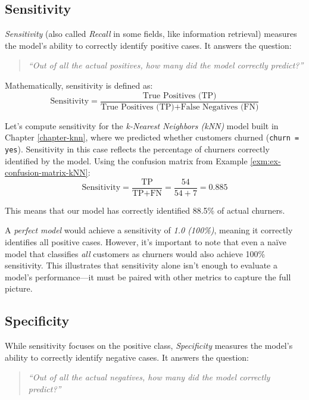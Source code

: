 \documentclass[
  11pt,
]{book}
\newcommand{\passthrough}[1]{#1}
\theoremstyle{definition}
\theoremstyle{definition}
\theoremstyle{definition}
\theoremstyle{definition}
\theoremstyle{remark}
\begin{document}
\subsection*{Sensitivity}\label{sensitivity}


\emph{Sensitivity} (also called \emph{Recall} in some fields, like information retrieval) measures the model's ability to correctly identify positive cases. It answers the question:

\begin{quote}
\emph{``Out of all the actual positives, how many did the model correctly predict?''}
\end{quote}

Mathematically, sensitivity is defined as:\\
\[
\text{Sensitivity} = \frac{\text{True Positives (TP)}}{\text{True Positives (TP)} + \text{False Negatives (FN)}}
\]

Let's compute sensitivity for the \emph{k-Nearest Neighbors (kNN)} model built in Chapter \ref{chapter-knn}, where we predicted whether customers churned (\passthrough{\lstinline!churn = yes!}). Sensitivity in this case reflects the percentage of churners correctly identified by the model. Using the confusion matrix from Example \ref{exm:ex-confusion-matrix-kNN}:\\
\[
\text{Sensitivity} = \frac{\text{TP}}{\text{TP} + \text{FN}} = \frac{54}{54 + 7} = 0.885
\]

This means that our model has correctly identified 88.5\% of actual churners.

A \emph{perfect model} would achieve a sensitivity of \emph{1.0 (100\%)}, meaning it correctly identifies all positive cases. However, it's important to note that even a naïve model that classifies \emph{all} customers as churners would also achieve 100\% sensitivity. This illustrates that sensitivity alone isn't enough to evaluate a model's performance---it must be paired with other metrics to capture the full picture.

\subsection*{Specificity}\label{specificity}


While sensitivity focuses on the positive class, \emph{Specificity} measures the model's ability to correctly identify negative cases. It answers the question:

\begin{quote}
\emph{``Out of all the actual negatives, how many did the model correctly predict?''}
\end{quote}
\end{document}

